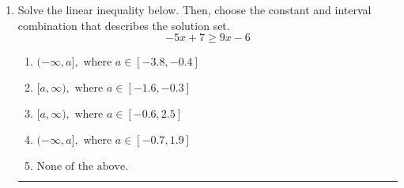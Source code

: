 \documentclass[14pt]{extbook}
\newcommand{\litem}[1]{\item#1\hspace*{-1cm}\rule{\textwidth}{0.4pt}}
\begin{document}
\begin{enumerate}
{\begin{enumerate}[label=\Alph*.]
\end{enumerate} }
\litem{
Solve the linear inequality below. Then, choose the constant and interval combination that describes the solution set.\[ -5x + 7 \geq 9x -6 \]\begin{enumerate}[label=\Alph*.]
\item \( (-\infty, a], \text{ where } a \in [-3.8, -0.4] \)
\item \( [a, \infty), \text{ where } a \in [-1.6, -0.3] \)
\item \( [a, \infty), \text{ where } a \in [-0.6, 2.5] \)
\item \( (-\infty, a], \text{ where } a \in [-0.7, 1.9] \)
\item \( \text{None of the above}. \)

\end{enumerate} }
\end{enumerate}
\end{document}
